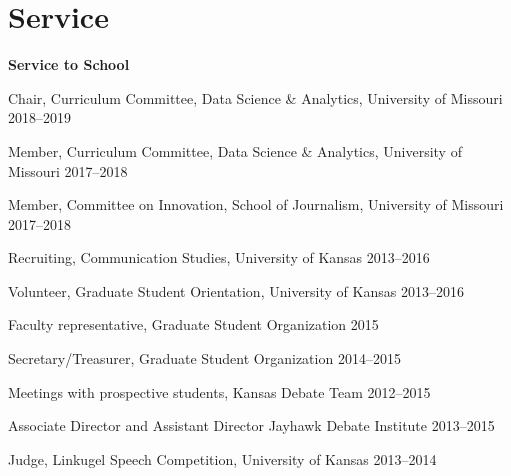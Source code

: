 \section{Service}

\textbf{Service to School}
  \begin{innerlist}
    \item Chair, Curriculum Committee, Data Science \& Analytics, University of Missouri \hfill 2018--2019
    \item Member, Curriculum Committee, Data Science \& Analytics, University of Missouri \hfill 2017--2018
    \item Member, Committee on Innovation, School of Journalism, University of Missouri \hfill 2017--2018
    \item Recruiting, Communication Studies, University of Kansas \hfill 2013--2016
    \item Volunteer, Graduate Student Orientation, University of Kansas \hfill 2013--2016
    \item Faculty representative, Graduate Student Organization \hfill 2015
    \item Secretary/Treasurer, Graduate Student Organization \hfill 2014--2015
    \item Meetings with prospective students, Kansas Debate Team \hfill 2012--2015
    \item Associate Director and Assistant Director Jayhawk Debate Institute \hfill 2013--2015
    \item Judge, Linkugel Speech Competition, University of Kansas \hfill 2013--2014
    \end{innerlist}\vspace{1em}

